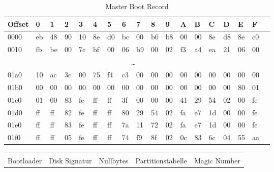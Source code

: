 \documentclass[12pt,a4paper]{article}
\begin{document}
\begin{table}[h]
\caption{Master Boot Record}
\vspace{.2cm}
\begin{tabularx}{\columnwidth}{|l|X|X|X|X|X|X|X|X|X|X|X|X|X|X|X|X|X|}
\hline
\rowcolor{yellow}Offset&0&1&2&3&4&5&6&7&8&9&A&B&C&D&E&F \\
\hline
\rowcolor{yellow}0000&eb&48&90&10&8e&d0&bc&00&b0&b8&00&00&8e&d8&8e&c0 \\
\hline
\rowcolor{yellow}0010&fb&be&00&7c&bf&00&06&b9&00&02&f3&a4&ea&21&06&00 \\
\hline
\multicolumn{17}{|c|}{\dots}\\
\hline
\rowcolor{yellow}01a0&10&ac&3c&00&75&f4&c3&00&00&00&00&00&00&00&00&00 \\
\hline
\cellcolor{yellow}01b0&\cellcolor{yellow}00&\cellcolor{yellow}00&\cellcolor{yellow}00&\cellcolor{yellow}00&\cellcolor{yellow}00&\cellcolor{yellow}00&\cellcolor{yellow}00&\cellcolor{yellow}00&\cellcolor{green!70!blue}00&\cellcolor{green!70!blue}00&\cellcolor{green!70!blue}00&\cellcolor{green!70!blue}00&\cellcolor{cyan!60!white}00&\cellcolor{cyan!60!white}00&\cellcolor{red!60!white}80&\cellcolor{red!60!white}01 \\
\hline
\rowcolor{red!60!white}01c0&01&00&83&fe&ff&ff&3f&00&00&00&41&29&54&02&\cellcolor{red!50!white}00&\cellcolor{red!50!white}fe\\
\hline
\rowcolor{red!50!white}01d0&ff&ff&82&fe&ff&ff&80&29&54&02&fa&e7&1d&00&\cellcolor{red!40!white}00&\cellcolor{red!40!white}fe \\
\hline
\rowcolor{red!40!white}01e0&ff&ff&83&fe&ff&ff&7a&11&72&02&fa&e7&1d&00&\cellcolor{red!30!white}00&\cellcolor{red!30!white}fe \\
\hline
\rowcolor{red!30!white}01f0&ff&ff&05&fe&ff&ff&74&f9&8f&02&0c&83&6c&04&\cellcolor{purple!50!blue}55&\cellcolor{purple!50!blue}aa \\
\hline
\end{tabularx}
\end{table}\newline
\begin{tabularx}{\columnwidth}{XXXXX}
\cellcolor{yellow}&\cellcolor{green!70!blue}&\cellcolor{cyan!60!white}&\cellcolor{red!60!white}&\cellcolor{purple!50!blue} \\
Bootloader&Disk Signatur&Nullbytes&Partitionstabelle&Magic Number \\
\end{tabularx}
\end{document}
